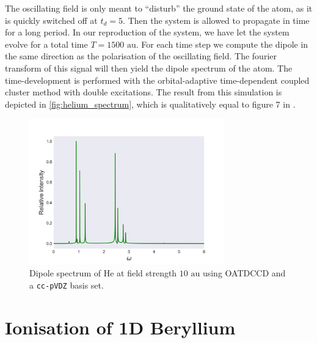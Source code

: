 The oscillating field is only meant to ``disturb'' the ground state of the atom,
as it is quickly 
switched off at $t_d=5$. Then the system is allowed to propagate in time for 
a long period. In our reproduction of the system, we have let the system 
evolve for a total time $T=1500 \text{ au}$. For each time step we compute the 
dipole in the same direction as the polarisation of the oscillating field. The 
fourier transform of this signal will then yield the dipole spectrum of the 
atom. The time-development is performed with the orbital-adaptive time-dependent 
coupled cluster method with double excitations. The result from this simulation is 
depicted in \autoref{fig:helium_spectrum}, which is qualitatively equal to figure 
7 in \citeauthor{pedersen2019symplectic}\cite{pedersen2019symplectic}.

\begin{figure}
    \centering
    \includegraphics[width=0.75\textwidth]{results/figures/helium_spectrum.png} 
    \caption{Dipole spectrum of He at field strength $10\text{ au}$ using 
        OATDCCD and a \lstinline{cc-pVDZ} basis set.      
    }
    \label{fig:helium_spectrum}
\end{figure}


\section{Ionisation of 1D Beryllium}
\label{sec:miyagi_replication}

